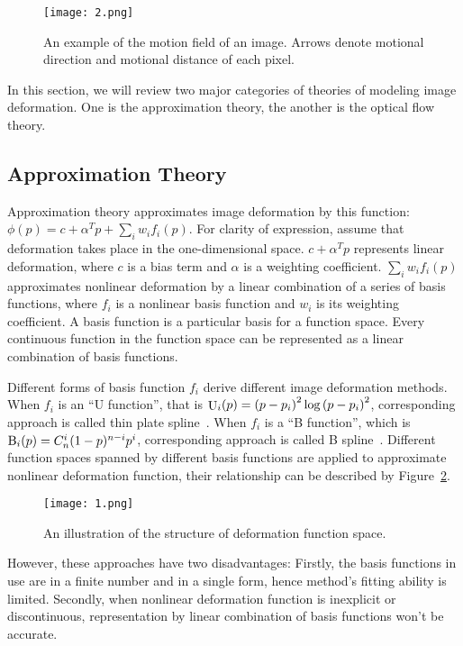 \documentclass{article}
\begin{document}
\begin{figure}[t]
    \centering
    \texttt{[image: 2.png]}
    \caption{\label{fig:2}An example of the motion field of an image. Arrows denote motional direction and motional distance of each pixel.}
\end{figure}

In this section, we will review two major categories of theories of modeling image deformation.
One is the approximation theory, the another is the optical flow theory.

\subsection{Approximation Theory}
Approximation theory approximates image deformation by this function: $\phi (p) = c + {\alpha ^T}p + \sum\nolimits_i {{w_i}{f_i}(p)}$.
For clarity of expression, assume that deformation takes place in the  one-dimensional space.
$c + {\alpha ^T}p$ represents linear deformation, where $c$ is a bias term and $\alpha$ is a weighting coefficient.
$\sum\nolimits_i {{w_i}{f_i}(p)}$ approximates nonlinear deformation by a linear combination of a series of basis functions, where ${f_i}$ is a nonlinear basis function and ${w_i}$ is its weighting coefficient.
A basis function is a particular basis for a function space.
Every continuous function in the function space can be represented as a linear combination of basis functions.

Different forms of basis function ${f_i}$ derive different image deformation methods.
When ${f_i}$ is an ``U function'', that is ${{\mathop{\rm U}\nolimits} _i}(p) = {\left( {p - {p_i}} \right)^2}\log {\left( {p - {p_i}} \right)^2}$, corresponding approach is called thin plate spline~\cite{tps}.
When ${f_i}$ is a ``B function'', which is ${{\rm{B}}_i}(p) = C_n^i{(1 - p)^{n - i}}{p^i}$, corresponding approach is called B spline~\cite{bspline}.
Different function spaces spanned by different basis functions are applied to approximate nonlinear deformation function, their relationship can be described by Figure~\ref{fig:3}.

\begin{figure}[t]
    \centering
    \texttt{[image: 1.png]}
    \caption{\label{fig:3}An illustration of the structure of deformation function space. }
\end{figure}

However, these approaches have two disadvantages:
Firstly, the basis functions in use are in a finite number and in a single form, hence method's fitting ability is limited.
Secondly, when nonlinear deformation function is inexplicit or discontinuous, representation by linear combination of basis functions won't be accurate.
\end{document}
